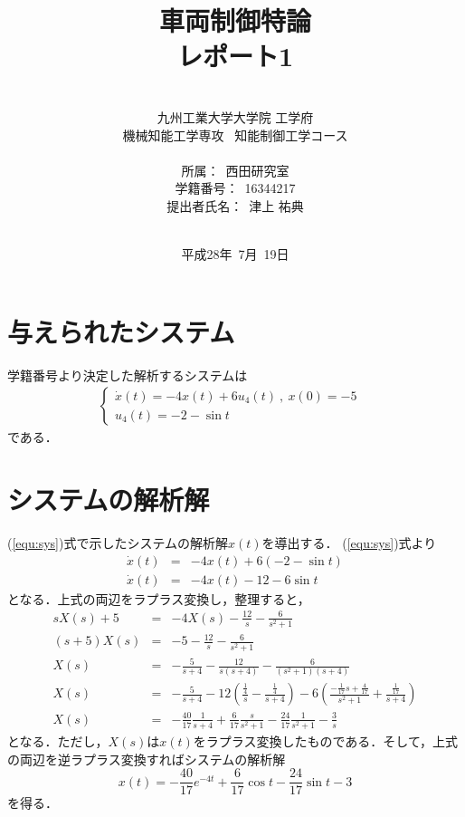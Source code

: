 \documentclass[a4paper,12pt]{jarticle}
\title{車両制御特論 \\
レポート1\\
}
\author{\vspace{40mm}\\
九州工業大学大学院 \hspace{0mm} 工学府\\
機械知能工学専攻\ \hspace{0mm} 知能制御工学コース \\
\vspace{5mm}\\
所属：\ 西田研究室\\
学籍番号：\ 16344217\\
提出者氏名：\ 津上 \hspace{0mm} 祐典\\\vspace{5mm}\\ }
\date{平成28年\ 7月\ 19日}
\begin{document}
\titlepage
\maketitle
\thispagestyle{empty}

\newpage
\section{与えられたシステム}
学籍番号より決定した解析するシステムは
\begin{eqnarray}\label{equ:sys}
 \begin{cases}
  \dot{x}(t) = -4x(t) + 6u_{4}(t) \ , \  x(0) = -5 \\
  u_{4}(t) = -2-\sin t &
 \end{cases}
\end{eqnarray}
である．
%
\section{システムの解析解}
(\ref{equ:sys})式で示したシステムの解析解$x(t)$を導出する．
(\ref{equ:sys})式より
%
\begin{eqnarray}
 \dot{x}(t) &=& -4x(t) + 6(-2-\sin t) \\
 \dot{x}(t) &=& -4x(t) -12 -6\sin t
\end{eqnarray}
%
となる．上式の両辺をラプラス変換し，整理すると，
%
\begin{eqnarray}
 sX(s) + 5 & = & -4X(s) - \frac{12}{s} - \frac{6}{s^2 + 1} \\
 (s+5)X(s) & = & -5 - \frac{12}{s} - \frac{6}{s^2 + 1} \\
 X(s) & = & -\frac{5}{s+4} - \frac{12}{s(s+4)} - \frac{6}{(s^2 + 1)(s+4)} \\
 X(s) & = & -\frac{5}{s+4} - 12 (\frac{\frac{1}{4}}{s} -
  \frac{\frac{1}{4}}{s+4}) -6(\frac{-\frac{1}{17}s+\frac{4}{17}}{s^2 +
  1}+\frac{\frac{1}{17}}{s+4}) \\
 X(s) & = & -\frac{40}{17}\frac{1}{s+4} + \frac{6}{17}\frac{s}{s^2 + 1}
  -\frac{24}{17}\frac{1}{s^2 + 1} -\frac{3}{s}
 \end{eqnarray}
となる．ただし，$X(s)$は$x(t)$をラプラス変換したものである．そして，上式
の両辺を逆ラプラス変換すればシステムの解析解
%
\begin{equation}
 x(t)  =  -\frac{40}{17}e^{-4t} + \frac{6}{17}\cos t -\frac{24}{17}\sin t -3
\end{equation}
%
を得る．
\end{document}
